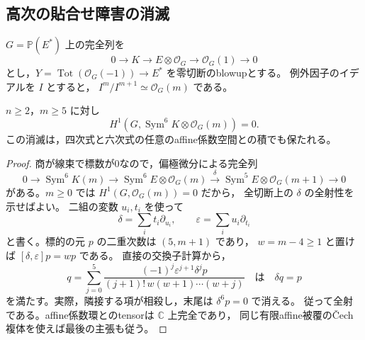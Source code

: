 \subsection{高次の貼合せ障害の消滅}

$G=\mathbb P(E^*)$ 上の完全列を
\[
 0\longrightarrow K\longrightarrow E\otimes\mathcal O_G
       \longrightarrow\mathcal O_G(1)\longrightarrow0
\]
とし，$Y=\operatorname{Tot}(\mathcal O_G(-1))\to E^*$ を零切断のblowupとする。
例外因子のイデアルを $I$ とすると，
$I^m/I^{m+1}\simeq\mathcal O_G(m)$ である。

\begin{lemma}\label{lem:degree-one-center-high-cohomology}
$n\ge2$，$m\ge5$ に対し
\[
 H^1(G,\operatorname{Sym}^6K\otimes\mathcal O_G(m))=0.
\]
この消滅は，四次式と六次式の任意のaffine係数空間との積でも保たれる。
\end{lemma}
\begin{proof}
商が線束で標数が0なので，偏極微分による完全列
\[
 0\longrightarrow\operatorname{Sym}^6K(m)
  \longrightarrow\operatorname{Sym}^6E\otimes\mathcal O_G(m)
  \xrightarrow{\delta}
       \operatorname{Sym}^5E\otimes\mathcal O_G(m+1)
  \longrightarrow0
\]
がある。$m\ge0$ では $H^1(G,\mathcal O_G(m))=0$ だから，
全切断上の $\delta$ の全射性を示せばよい。
二組の変数 $u_i,t_i$ を使って
\[
 \delta=\sum_i t_i\partial_{u_i},\qquad
 \varepsilon=\sum_i u_i\partial_{t_i}
\]
と書く。標的の元 $p$ の二重次数は $(5,m+1)$ であり，
$w=m-4\ge1$ と置けば $[\delta,\varepsilon]p=wp$ である。
直接の交換子計算から，
\[
 q=\sum_{j=0}^{5}
    \frac{(-1)^j\varepsilon^{j+1}\delta^jp}
    {(j+1)!\,w(w+1)\cdots(w+j)}
 \quad\text{は}\quad \delta q=p
\]
を満たす。実際，隣接する項が相殺し，末尾は $\delta^6p=0$ で消える。
従って全射である。affine係数環とのtensorは $\mathbb C$ 上完全であり，
同じ有限affine被覆の\v{C}ech複体を使えば最後の主張も従う。
\end{proof}

